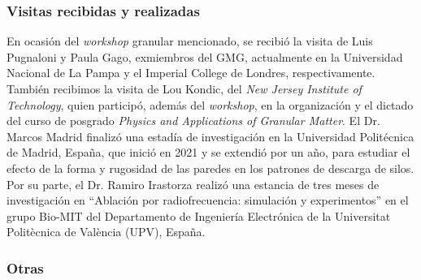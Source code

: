 \documentclass[a4paper,11pt,twoside,final,titlepage,onecolumn,openright]{report}
\begin{document}
\subsubsection{Visitas recibidas y realizadas}

En ocasión del \textit{workshop} granular mencionado, se recibió la visita de Luis Pugnaloni y Paula Gago, exmiembros del GMG, actualmente en la Universidad Nacional de La Pampa y el Imperial College de Londres, respectivamente. También recibimos la visita de Lou Kondic, del \textit{New Jersey Institute of Technology}, quien participó, además del \textit{workshop}, en la organización y el dictado del curso de posgrado \textit{Physics and Applications of Granular Matter}. El Dr. Marcos Madrid finalizó una estadía de investigación en la Universidad Politécnica de Madrid, España, que inició en 2021 y se extendió por un año, para estudiar el efecto de la forma y rugosidad de las paredes en los patrones de descarga de silos. Por su parte, el Dr. Ramiro Irastorza realizó una estancia de tres meses de investigación en ``Ablación por radiofrecuencia: simulación y experimentos'' en el grupo Bio-MIT del Departamento de Ingeniería Electrónica de la Universitat Politècnica de València (UPV), España.

% 
% 
% 
%  

\subsubsection{Otras}
\end{document}
